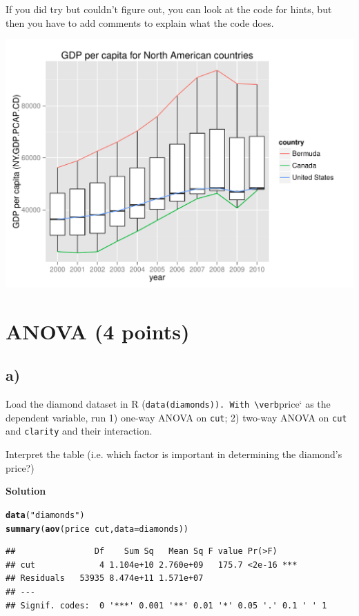 \documentclass{article}\usepackage[]{graphicx}\usepackage[]{color}
\makeatletter
\def\maxwidth{ %
  \ifdim\Gin@nat@width>\linewidth
    \linewidth
  \else
    \Gin@nat@width
  \fi
}
\newcommand{\hlstr}[1]{\textcolor[rgb]{0.192,0.494,0.8}{#1}}%
\newcommand{\hlopt}[1]{\textcolor[rgb]{0,0,0}{#1}}%
\newcommand{\hlstd}[1]{\textcolor[rgb]{0.345,0.345,0.345}{#1}}%
\newcommand{\hlkwc}[1]{\textcolor[rgb]{0.333,0.667,0.333}{#1}}%
\newcommand{\hlkwd}[1]{\textcolor[rgb]{0.737,0.353,0.396}{\textbf{#1}}}%
\newenvironment{kframe}{%
 \def\at@end@of@kframe{}%
 \ifinner\ifhmode%
  \def\at@end@of@kframe{\end{minipage}}%
  \begin{minipage}{\columnwidth}%
 \fi\fi%
 \def\FrameCommand##1{\hskip\@totalleftmargin \hskip-\fboxsep
 \colorbox{shadecolor}{##1}\hskip-\fboxsep
     \hskip-\linewidth \hskip-\@totalleftmargin \hskip\columnwidth}%
 \MakeFramed {\advance\hsize-\width
   \@totalleftmargin\z@ \linewidth\hsize
   \@setminipage}}%
 {\par\unskip\endMakeFramed%
 \at@end@of@kframe}
\newenvironment{knitrout}{}{} %
\makeatother
\begin{document}
If you did try but couldn't figure out, you can look at the code for hints, but then you have to add comments to explain what the code does.

\begin{knitrout}
\color{fgcolor}
\includegraphics[width=\maxwidth]{figure/unnamed-chunk-5-1} 

\end{knitrout}

\section{ANOVA (4 points)}

\subsection*{a)}

Load the diamond dataset in R (\verb`data(diamonds)). With \verb`price` as the dependent variable, run 1) one-way ANOVA on \verb`cut`; 2) two-way ANOVA on \verb`cut` and \verb`clarity` and their interaction.

Interpret the table (i.e. which factor is important in determining the diamond's price?)

\textbf{Solution}

\begin{knitrout}
\color{fgcolor}\begin{kframe}
\begin{alltt}
\hlkwd{data}\hlstd{(}\hlstr{"diamonds"}\hlstd{)}
\hlkwd{summary}\hlstd{(}\hlkwd{aov}\hlstd{(price} \hlopt{~} \hlstd{cut,} \hlkwc{data} \hlstd{= diamonds))}
\end{alltt}
\begin{verbatim}
##                Df    Sum Sq   Mean Sq F value Pr(>F)    
## cut             4 1.104e+10 2.760e+09   175.7 <2e-16 ***
## Residuals   53935 8.474e+11 1.571e+07                   
## ---
## Signif. codes:  0 '***' 0.001 '**' 0.01 '*' 0.05 '.' 0.1 ' ' 1
\end{verbatim}
\end{kframe}
\end{knitrout}
\end{document}
